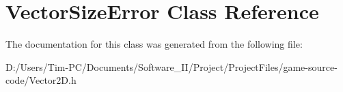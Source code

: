 \hypertarget{class_vector_size_error}{}\section{Vector\+Size\+Error Class Reference}
\label{class_vector_size_error}


The documentation for this class was generated from the following file\+:\begin{DoxyCompactItemize}
\item 
D\+:/\+Users/\+Tim-\/\+P\+C/\+Documents/\+Software\+\_\+\+I\+I/\+Project/\+Project\+Files/game-\/source-\/code/Vector2\+D.\+h\end{DoxyCompactItemize}
